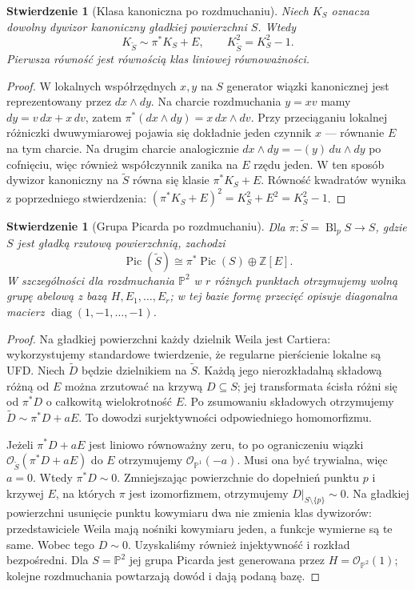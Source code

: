 \documentclass[11pt,a4paper,openany]{report}
\numberwithin{equation}{section}
\theoremstyle{plain}
\newtheorem{stwierdzenie}[twierdzenie]{Stwierdzenie}
\theoremstyle{definition}
\theoremstyle{remark}
\newcommand{\Z}{\mathbb Z}
\newcommand{\PP}{\mathbb P}
\begin{document}
\begin{stwierdzenie}[Klasa kanoniczna po rozdmuchaniu]
\label{st:ga6-Kblowup}
Niech $K_S$ oznacza dowolny dywizor kanoniczny
gładkiej powierzchni $S$. Wtedy
\[
 K_{\widetilde S}\sim\pi^*K_S+E,
 \qquad K_{\widetilde S}^2=K_S^2-1.
\]
Pierwsza równość jest równością klas liniowej równoważności.
\end{stwierdzenie}
\begin{proof}
W lokalnych współrzędnych $x,y$ na $S$ generator
wiązki kanonicznej jest reprezentowany przez
$dx\wedge dy$. Na charcie rozdmuchania $y=xv$
mamy $dy=v\,dx+x\,dv$, zatem
$\pi^*(dx\wedge dy)=x\,dx\wedge dv$.
Przy przeciąganiu lokalnej różniczki dwuwymiarowej
pojawia się dokładnie jeden czynnik $x$ — równanie
$E$ na tym charcie. Na drugim charcie analogicznie
$dx\wedge dy=-(y)\,du\wedge dy$ po cofnięciu,
więc również współczynnik zanika na $E$ rzędu jeden.
W ten sposób dywizor kanoniczny na $\widetilde S$
równa się klasie $\pi^*K_S+E$.
Równość kwadratów wynika z poprzedniego stwierdzenia:
$(\pi^*K_S+E)^2=K_S^2+E^2=K_S^2-1$.
\end{proof}

\begin{stwierdzenie}[Grupa Picarda po rozdmuchaniu]
\label{st:ga6-pic-blowup}
Dla $\pi:\widetilde S=\operatorname{Bl}_pS\to S$,
gdzie $S$ jest gładką rzutową powierzchnią, zachodzi
\[
 \operatorname{Pic}(\widetilde S)\cong
 \pi^*\operatorname{Pic}(S)\oplus\Z[E].
\]
W szczególności dla rozdmuchania $\PP^2$ w $r$
różnych punktach otrzymujemy wolną grupę abelową
z bazą $H,E_1,\ldots,E_r$; w tej bazie formę
przecięć opisuje diagonalna macierz
$\operatorname{diag}(1,-1,\ldots,-1)$.
\end{stwierdzenie}
\begin{proof}
Na gładkiej powierzchni każdy dzielnik Weila jest
Cartiera: wykorzystujemy standardowe twierdzenie,
że regularne pierścienie lokalne są UFD. Niech
$\widetilde D$ będzie dzielnikiem na $\widetilde S$.
Każdą jego nierozkładalną składową różną od $E$
można zrzutować na krzywą $D\subseteq S$; jej
transformata ścisła różni się od $\pi^*D$ o
całkowitą wielokrotność $E$. Po zsumowaniu składowych
otrzymujemy $\widetilde D\sim\pi^*D+aE$.
To dowodzi surjektywności odpowiedniego homomorfizmu.

Jeżeli $\pi^*D+aE$ jest liniowo równoważny zeru,
to po ograniczeniu wiązki $\mathcal O_{\widetilde S}(\pi^*D+aE)$
do $E$ otrzymujemy $\mathcal O_{\PP^1}(-a)$.
Musi ona być trywialna, więc $a=0$. Wtedy
$\pi^*D\sim0$. Zmniejszając powierzchnie do
dopełnień punktu $p$ i krzywej $E$, na których
$\pi$ jest izomorfizmem, otrzymujemy $D|_{S\setminus\{p\}}\sim0$.
Na gładkiej powierzchni usunięcie punktu kowymiaru
dwa nie zmienia klas dywizorów: przedstawiciele
Weila mają nośniki kowymiaru jeden, a funkcje
wymierne są te same. Wobec tego $D\sim0$.
Uzyskaliśmy również injektywność i rozkład bezpośredni.
Dla $S=\PP^2$ jej grupa Picarda jest generowana
przez $H=\mathcal O_{\PP^2}(1)$; kolejne rozdmuchania
powtarzają dowód i dają podaną bazę.
\end{proof}
\end{document}
